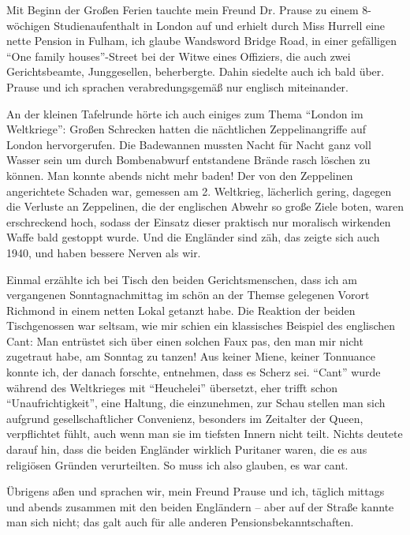 \documentclass[a5paper,pagesize,10pt,twoside=true]{scrbook}
\begin{document}
Mit Beginn der Großen Ferien tauchte mein Freund Dr. Prause zu einem 8-wöchigen Studienaufenthalt in London auf und erhielt durch Miss Hurrell eine nette Pension in Fulham, ich glaube Wandsword Bridge Road, in einer gefälligen \enquote{One family houses}-Street bei der Witwe eines Offiziers, die auch zwei Gerichtsbeamte, Junggesellen, beherbergte. Dahin siedelte auch ich bald über. Prause und ich sprachen verabredungsgemäß nur englisch miteinander.

An der kleinen Tafelrunde hörte ich auch einiges zum Thema \enquote{London im Weltkriege}: Großen Schrecken hatten die nächtlichen Zeppelinangriffe auf London hervorgerufen. Die Badewannen mussten Nacht für Nacht ganz voll Wasser sein um durch Bombenabwurf entstandene Brände rasch löschen zu können. Man konnte abends nicht mehr baden! Der von den Zeppelinen angerichtete Schaden war, gemessen am 2. Weltkrieg, lächerlich gering, dagegen die Verluste an Zeppelinen, die der englischen Abwehr so große Ziele boten, waren erschreckend hoch, sodass der Einsatz dieser praktisch nur moralisch wirkenden Waffe bald gestoppt wurde. Und die Engländer sind zäh, das zeigte sich auch 1940, und haben bessere Nerven als wir.

Einmal erzählte ich bei Tisch den beiden Gerichtsmenschen, dass ich am vergangenen Sonntagnachmittag im schön an der Themse gelegenen Vorort Richmond in einem netten Lokal getanzt habe. Die Reaktion der beiden Tischgenossen war seltsam, wie mir schien ein klassisches Beispiel des englischen Cant: Man entrüstet sich über einen solchen Faux pas, den man mir nicht zugetraut habe, am Sonntag zu tanzen! Aus keiner Miene, keiner Tonnuance konnte ich, der danach forschte, entnehmen, dass es Scherz sei. \enquote{Cant} wurde während des Weltkrieges mit \enquote{Heuchelei} übersetzt, eher trifft schon \enquote{Unaufrichtigkeit}, eine Haltung, die einzunehmen, zur Schau stellen man sich aufgrund gesellschaftlicher Convenienz, besonders im Zeitalter der Queen, verpflichtet fühlt, auch wenn man sie im tiefsten Innern nicht teilt. Nichts deutete darauf hin, dass die beiden Engländer wirklich Puritaner waren, die es aus religiösen Gründen verurteilten. So muss ich also glauben, es war cant.

Übrigens aßen und sprachen wir, mein Freund Prause und ich, täglich mittags und abends zusammen mit den beiden Engländern -- aber auf der Straße kannte man sich nicht; das galt auch für alle anderen Pensionsbekanntschaften.
\end{document}
